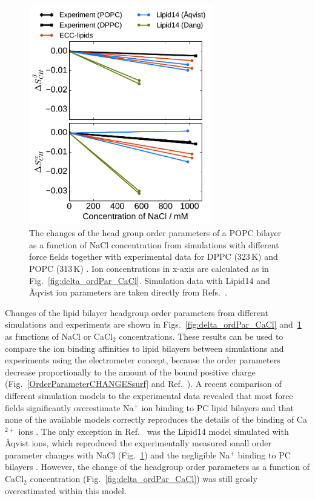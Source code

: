 \documentclass[aip,jcp,twocolumn]{revtex4}
\begin{document}
\begin{figure}[htb!]
  \centering
  \includegraphics[width=8.0cm]{../Fig/ipython_nb/OrdPars-A-B_L14-ECCL17_q80_sig89_NaCl.pdf}
  \caption{\label{fig:delta_ordPar_NaCl}
    The changes of the head group order parameters of a POPC bilayer as a function of NaCl concentration
    from simulations with different force fields together with 
    experimental data for DPPC (323\,K) \cite{akutsu81} and POPC (313\,K) \cite{altenbach84}.
    Ion concentrations in x-axis are calculated as in Fig.~\ref{fig:delta_ordPar_CaCl}.
    Simulation data with Lipid14 and \AA{}qvist ion parameters are taken directly from
    Refs.~\cite{lipid14POPC0mMNaClfiles,lipid14POPC1000mMNaClfiles}.
  }
\end{figure}


Changes of the lipid bilayer headgroup order parameters from different simulations and
experiments \cite{akutsu81,altenbach84} are shown in Figs.~\ref{fig:delta_ordPar_CaCl} and~\ref{fig:delta_ordPar_NaCl}
as functions of NaCl or CaCl$_2$ concentrations.
These results can be used to compare the ion binding affinities to lipid bilayers
between simulations and experiments using the electrometer concept, because 
the order parameters decrease proportionally 
to the amount of the bound positive charge (Fig.~\ref{OrderParameterCHANGESsurf} and Ref.~). 
A recent comparison of different simulation models to the experimental data
revealed that most force fields significantly overestimate Na$^+$ ion binding to PC
lipid bilayers and that none of the available models correctly reproduces
the details of the binding of Ca$^{2+}$ ions \cite{catte16}.
The only exception in Ref.~ was the Lipid14 model \cite{dickson14} simulated with \AA{}qvist ions,
which reproduced the experimentally measured 
small order parameter changes with NaCl (Fig.~\ref{fig:delta_ordPar_NaCl})
and the negligible Na$^+$ binding to PC bilayers \cite{akutsu81,altenbach84}.
However, the change of the headgroup order parameters as a function of CaCl$_2$ concentration 
(Fig.~\ref{fig:delta_ordPar_CaCl}) was still grosly overestimated within this model.
\end{document}
